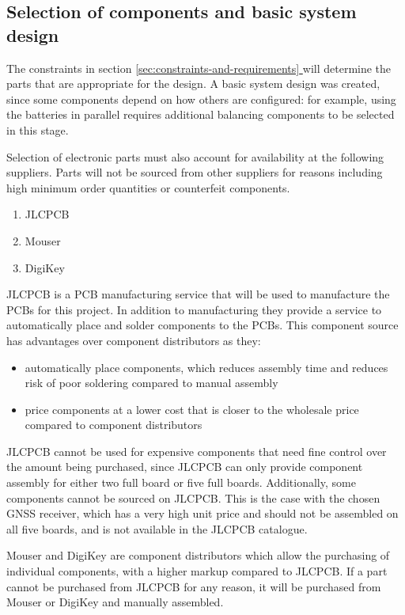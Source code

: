 \documentclass[a4paper,11pt]{article}
\newcommand*{\fullref}[1]{\hyperref[{#1}]{\ref*{#1} \nameref*{#1}}}
\begin{document}
\subsection{Selection of components and basic system design}

The constraints in section \fullref{sec:constraints-and-requirements} will determine the parts that are appropriate for the design. A basic system design was created, since some components depend on how others are configured: for example, using the batteries in parallel requires additional balancing components to be selected in this stage.

Selection of electronic parts must also account for availability at the following suppliers. Parts will not be sourced from other suppliers for reasons including high minimum order quantities or counterfeit components.

\begin{enumerate}
  \item JLCPCB
  \item Mouser
  \item DigiKey
\end{enumerate}

JLCPCB is a PCB manufacturing service that will be used to manufacture the PCBs  for this project. In addition to manufacturing they provide a service to automatically place and solder components to the PCBs. This component source has advantages over component distributors as they:
\begin{itemize}
  \item automatically place components, which reduces assembly time and reduces risk of poor soldering compared to manual assembly
  \item price components at a lower cost that is closer to the wholesale price compared to component distributors
\end{itemize}

JLCPCB cannot be used for expensive components that need fine control over the amount being purchased, since JLCPCB can only provide component assembly for either two full board or five full boards. Additionally, some components cannot be sourced on JLCPCB. This is the case with the chosen GNSS receiver, which has a very high unit price and should not be assembled on all five boards, and is not available in the JLCPCB catalogue.

Mouser and DigiKey are component distributors which allow the purchasing of individual components, with a higher markup compared to JLCPCB. If a part cannot be purchased from JLCPCB for any reason, it will be purchased from Mouser or DigiKey and manually assembled.
\end{document}
